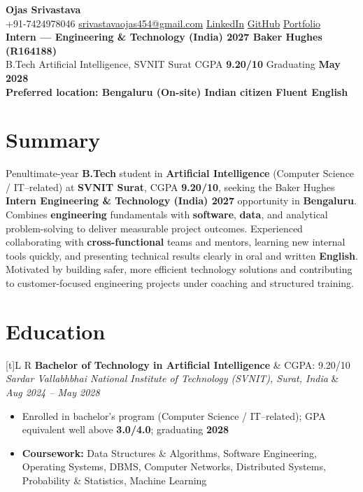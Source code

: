 \documentclass[a4paper,10pt]{article}
\newcommand{\resumeSubheading}[4]{%
  \vspace{0.4mm}
  \noindent
  \begin{tabularx}{\textwidth}[t]{L R}
    \textbf{#1} & #4 \\
    \textit{#3} & \textit{#2} \\
  \end{tabularx}
  \vspace{-0.4mm}%
}
\begin{document}
\selectfont

\begin{center}
  {\LARGE \textbf{Ojas Srivastava}} \\[0.8mm]
  \small
  +91-7424978046 \textbar{}
  \href{mailto:srivastavaojas454@gmail.com}{srivastavaojas454@gmail.com} \textbar{}
  \href{https://linkedin.com/in/ojas-srivastava05}{LinkedIn} \textbar{}
  \href{https://github.com/Ojas-Srivastava05}{GitHub} \textbar{}
  \href{https://ojas-srivastava.vercel.app}{Portfolio} \\[0.3mm]
  \textbf{Intern --- Engineering \& Technology (India) 2027 \textbar{} Baker Hughes (R164188)} \\[0.2mm]
  B.Tech Artificial Intelligence, SVNIT Surat \textbar{}
  CGPA \textbf{9.20/10} \textbar{}
  Graduating \textbf{May 2028} \\[0.2mm]
  \textbf{Preferred location: Bengaluru (On-site) \textbar{} Indian citizen \textbar{} Fluent English}
\end{center}

\vspace{-0.8mm}

\section{Summary}
\small
Penultimate-year \textbf{B.Tech} student in \textbf{Artificial Intelligence} (Computer Science / IT--related) at \textbf{SVNIT Surat}, CGPA \textbf{9.20/10}, seeking the Baker Hughes \textbf{Intern Engineering \& Technology (India) 2027} opportunity in \textbf{Bengaluru}. Combines \textbf{engineering} fundamentals with \textbf{software}, \textbf{data}, and analytical problem-solving to deliver measurable project outcomes. Experienced collaborating with \textbf{cross-functional} teams and mentors, learning new internal tools quickly, and presenting technical results clearly in oral and written \textbf{English}. Motivated by building safer, more efficient technology solutions and contributing to customer-focused engineering projects under coaching and structured training.

\section{Education}
\small
\resumeSubheading
  {Bachelor of Technology in Artificial Intelligence}{Aug 2024 -- May 2028}
  {Sardar Vallabhbhai National Institute of Technology (SVNIT), Surat, India}{CGPA: 9.20/10}
\begin{itemize}
  \item Enrolled in bachelor's program (Computer Science / IT--related); GPA equivalent well above \textbf{3.0/4.0}; graduating \textbf{2028}
  \item \textbf{Coursework:} Data Structures \& Algorithms, Software Engineering, Operating Systems, DBMS, Computer Networks, Distributed Systems, Probability \& Statistics, Machine Learning
\end{itemize}
\end{document}
